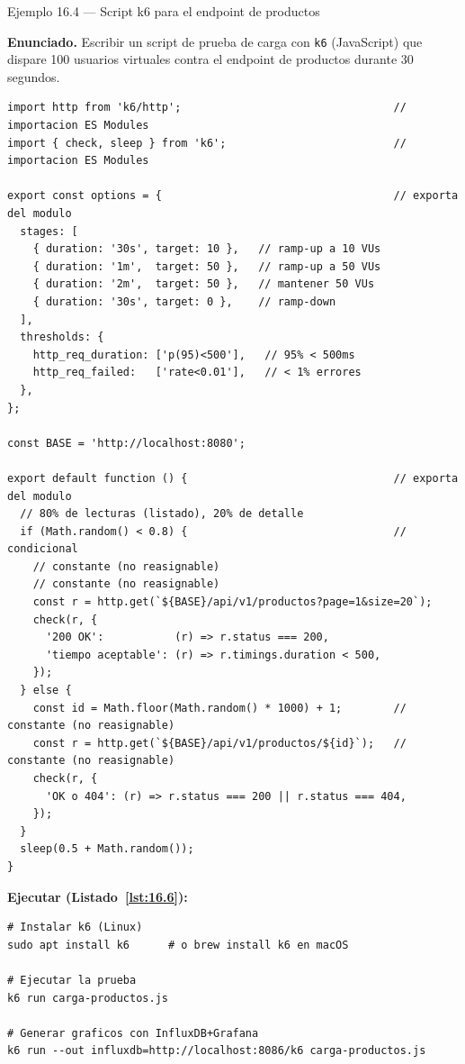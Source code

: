 \documentclass[11pt,a4paper,openany]{book}
\begin{document}
\begin{cajaejemplo}{Ejemplo 16.4 --- Script k6 para el endpoint de productos}

\textbf{Enunciado.} Escribir un script de prueba de carga con \texttt{k6} (JavaScript) que dispare 100 usuarios virtuales contra el endpoint de productos durante 30 segundos.

\begin{lstlisting}[style=js,caption={carga-productos.js},label=lst:16.5]
import http from 'k6/http';                                 // importacion ES Modules
import { check, sleep } from 'k6';                          // importacion ES Modules

export const options = {                                    // exporta del modulo
  stages: [
    { duration: '30s', target: 10 },   // ramp-up a 10 VUs
    { duration: '1m',  target: 50 },   // ramp-up a 50 VUs
    { duration: '2m',  target: 50 },   // mantener 50 VUs
    { duration: '30s', target: 0 },    // ramp-down
  ],
  thresholds: {
    http_req_duration: ['p(95)<500'],   // 95% < 500ms
    http_req_failed:   ['rate<0.01'],   // < 1% errores
  },
};

const BASE = 'http://localhost:8080';

export default function () {                                // exporta del modulo
  // 80% de lecturas (listado), 20% de detalle
  if (Math.random() < 0.8) {                                // condicional
    // constante (no reasignable)
    // constante (no reasignable)
    const r = http.get(`${BASE}/api/v1/productos?page=1&size=20`);
    check(r, {
      '200 OK':           (r) => r.status === 200,
      'tiempo aceptable': (r) => r.timings.duration < 500,
    });
  } else {
    const id = Math.floor(Math.random() * 1000) + 1;        // constante (no reasignable)
    const r = http.get(`${BASE}/api/v1/productos/${id}`);   // constante (no reasignable)
    check(r, {
      'OK o 404': (r) => r.status === 200 || r.status === 404,
    });
  }
  sleep(0.5 + Math.random());
}
\end{lstlisting}

\textbf{Ejecutar (Listado~\ref{lst:16.6}):}
\begin{lstlisting}[style=shell,numbers=none,caption={Ejemplo de Shell},label=lst:16.6]
# Instalar k6 (Linux)
sudo apt install k6      # o brew install k6 en macOS

# Ejecutar la prueba
k6 run carga-productos.js

# Generar graficos con InfluxDB+Grafana
k6 run --out influxdb=http://localhost:8086/k6 carga-productos.js
\end{lstlisting}
\end{cajaejemplo}
\end{document}
